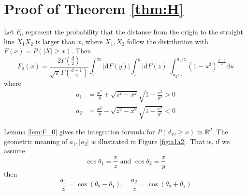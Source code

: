 \documentclass{aptpub}
\def\R{\mathbb{R}}
\def\d{\mathrm{d}}
\begin{document}
\section{Proof of Theorem \ref{thm:H}}\label{app:th}
\begin{lemma}\label{lem:F_0}
     Let $F_0$ represent the
probability that the distance from the origin to the straight line
$X_1X_2$ is larger than $x$, where $X_1, X_2$ follow the distribution with $F(x)=P(|X|\geq x)$.
Then 
\begin{equation}\label{eq:F_0_expression}
     F_0(x)=\frac{2\Gamma(\frac{d}{2})}
     {\sqrt{\pi}\Gamma(\frac{d-1}{2})}
     \int_x^{\infty} |\d F(y)|
     \int_x^{y} |\d F(z)| \int_{a_2/z}^{a_1 /z} (1-u^2)^{\frac{d-3}{2}} \d u
 \end{equation}
where
\begin{align}
     a_1 & =\frac{x^2}{y}+\sqrt{z^2-x^2}\sqrt{1-\frac{x^2}{y^2}} > 0
     \label{eq:a_1} \\
a_2 & =\frac{x^2}{y}-\sqrt{z^2-x^2}\sqrt{1-\frac{x^2}{y^2}} < 0
\label{eq:a_2}
\end{align}
\end{lemma}
Lemma \ref{lem:F_0} gives the integration formula for $P(d_{12}\geq x)$ in $\R^d$.
The geometric meaning of $a_1, |a_2|$ is illustrated in Figure
\ref{fig:a1a2}. That is, if we assume
\begin{equation}\label{eq:theta_1_theta_2}
     \cos\theta_1=\frac{x}{z}
     \textrm{ and } \cos\theta_2=\frac{x}{y} 
\end{equation}
then
\begin{equation}\label{eq:a_1_a_2}
     \frac{a_1}{z} = \cos(\theta_2 - \theta_1),
     \quad
     \frac{a_2}{z} = \cos(\theta_2+\theta_1)           
\end{equation}
\end{document}
